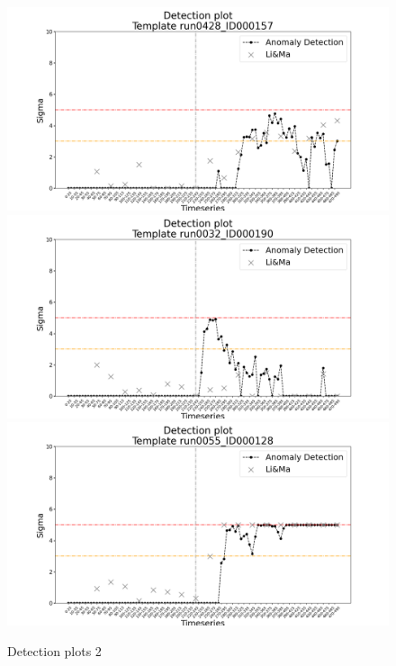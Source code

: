 \begin{figure}
    \includegraphics[width=1\textwidth]{figures/experiments/detection_plots/detection_plot_run0428_ID000157_testset_e.png}\hfill
    \\[\smallskipamount]

    \includegraphics[width=1\textwidth]{figures/experiments/detection_plots/detection_plot_run0032_ID000190_testset_e.png}\hfill
    \\[\smallskipamount]
    
    \includegraphics[width=1\textwidth]{figures/experiments/detection_plots/detection_plot_run0055_ID000128_testset_e.png}\hfill
    \\[\smallskipamount]
    \caption{Detection plots 2}\label{fig:detection-plots-2}
\end{figure}



